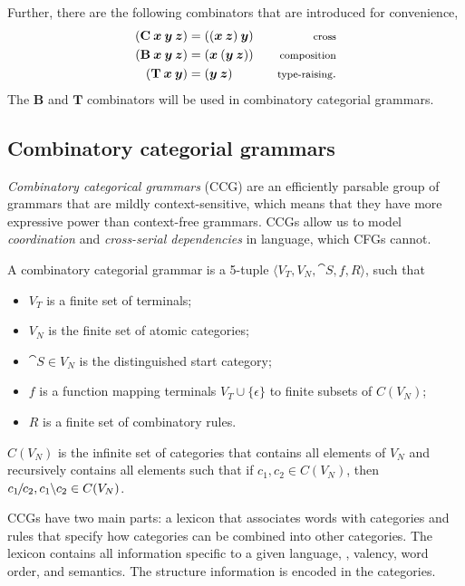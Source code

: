 Further, there are the following combinators that are introduced for
convenience,
\begin{align*}
  (\mathbf{C} \: \bm{x} \: \bm{y} \: \bm{z}) &= ((\bm{x} \: \bm{z}) \: \bm{y}) & \text{\footnotesize cross} \\
  (\mathbf{B} \: \bm{x} \: \bm{y} \: \bm{z}) &= (\bm{x} \: (\bm{y} \: \bm{z})) & \text{\footnotesize composition} \\
  (\mathbf{T} \: \bm{x} \: \bm{y}) &= (\bm{y} \: \bm{z}) & \text{\footnotesize type-raising}
.\end{align*}
The $\mathbf{B}$ and $\mathbf{T}$ combinators will be used in combinatory
categorial grammars.

\subsection{Combinatory categorial grammars}

\textit{Combinatory categorical grammars} (CCG) are an efficiently parsable
group of grammars that are mildly context-sensitive, which means that they have
more expressive power than context-free grammars. CCGs allow us to model
\textit{coordination} and \textit{cross-serial dependencies} in language, which
CFGs cannot.

\begin{definition}
  A combinatory categorial grammar is a 5-tuple $\langle V_T, V_N, \cat{S}, f,
  R\rangle$, such that
  \begin{itemize}
    \item $V_T$ is a finite set of terminals;
    \item $V_N$ is the finite set of atomic categories;
    \item $\cat{S} \in V_N$ is the distinguished start category;
    \item $f$ is a function mapping terminals $V_T \cup \{ \epsilon \}$ to
      finite subsets of $C(V_N)$;
    \item $R$ is a finite set of combinatory rules.
  \end{itemize}

  $C(V_N)$ is the infinite set of categories that contains all elements of $V_N$
  and recursively contains all elements such that if $c_1,c_2\in C(V_N)$, then
  $c_1 \kern-1pt /\kern-1pt c_2, c_1 \kern-.3pt \backslash\kern-.2pt c_2 \in C(V_N)$.
\end{definition}

CCGs have two main parts: a lexicon that associates words with categories and
rules that specify how categories can be combined into other categories. The
lexicon contains all information specific to a given language, \ie, valency,
word order, and semantics. The structure information is encoded in the
categories.

